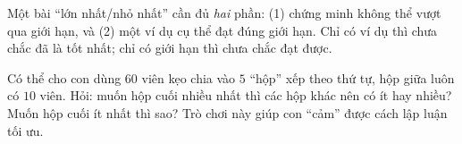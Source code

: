 {\begin{warnbox}Một bài ``lớn nhất/nhỏ nhất'' cần đủ \emph{hai} phần: (1) chứng minh không thể vượt qua giới hạn, và (2) một ví dụ cụ thể đạt đúng giới hạn. Chỉ có ví dụ thì chưa chắc đã là tốt nhất; chỉ có giới hạn thì chưa chắc đạt được.\end{warnbox}

\begin{parentbox}Có thể cho con dùng $60$ viên kẹo chia vào $5$ ``hộp'' xếp theo thứ tự, hộp giữa luôn có $10$ viên. Hỏi: muốn hộp cuối nhiều nhất thì các hộp khác nên có ít hay nhiều? Muốn hộp cuối ít nhất thì sao? Trò chơi này giúp con ``cảm'' được cách lập luận tối ưu.\end{parentbox}

}
